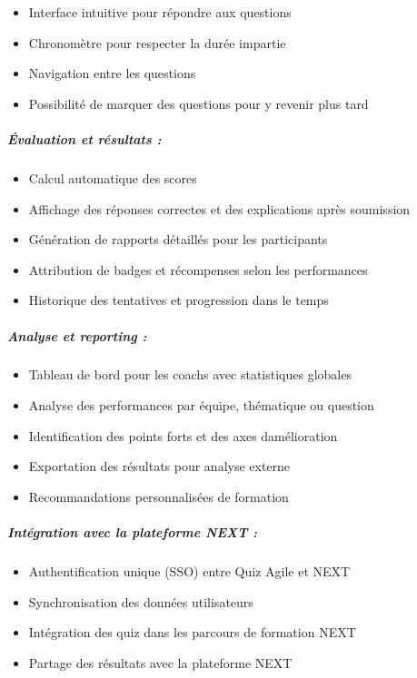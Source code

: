 \documentclass[12pt,a4paper,twoside,openright]{report}
\begin{document}
\begin{itemize}
\item
  Interface intuitive pour répondre aux questions
\item
  Chronomètre pour respecter la durée impartie
\item
  Navigation entre les questions
\item
  Possibilité de marquer des questions pour y revenir plus tard
\end{itemize}

\hypertarget{uxe9valuation-et-ruxe9sultats}{%
\subparagraph{Évaluation et résultats
:}\label{uxe9valuation-et-ruxe9sultats}}

\begin{itemize}
\item
  Calcul automatique des scores
\item
  Affichage des réponses correctes et des explications après soumission
\item
  Génération de rapports détaillés pour les participants
\item
  Attribution de badges et récompenses selon les performances
\item
  Historique des tentatives et progression dans le temps
\end{itemize}

\hypertarget{analyse-et-reporting}{%
\subparagraph{Analyse et reporting :}\label{analyse-et-reporting}}

\begin{itemize}
\item
  Tableau de bord pour les coachs avec statistiques globales
\item
  Analyse des performances par équipe, thématique ou question
\item
  Identification des points forts et des axes
  d\textquotesingle amélioration
\item
  Exportation des résultats pour analyse externe
\item
  Recommandations personnalisées de formation
\end{itemize}

\hypertarget{intuxe9gration-avec-la-plateforme-next}{%
\subparagraph{Intégration avec la plateforme NEXT
:}\label{intuxe9gration-avec-la-plateforme-next}}

\begin{itemize}
\item
  Authentification unique (SSO) entre Quiz Agile et NEXT
\item
  Synchronisation des données utilisateurs
\item
  Intégration des quiz dans les parcours de formation NEXT
\item
  Partage des résultats avec la plateforme NEXT
\end{itemize}
\end{document}
